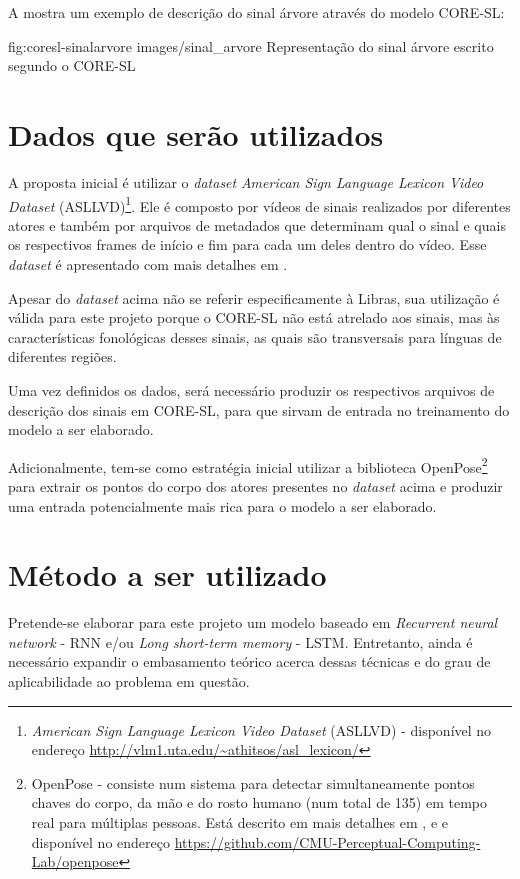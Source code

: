 A  mostra um exemplo de descrição do sinal árvore através do modelo CORE-SL:

\image
    {fig:coresl-sinalarvore}
    {images/sinal_arvore}
    {Representação do sinal árvore escrito segundo o CORE-SL}
    

\section{Dados que serão utilizados}
A proposta inicial é utilizar o \textit{dataset} \textit{American Sign Language Lexicon Video Dataset} (ASLLVD)\footnote{\textit{American Sign Language Lexicon Video Dataset} (ASLLVD) - disponível no endereço \url{http://vlm1.uta.edu/~athitsos/asl_lexicon/}}. Ele é composto por vídeos de sinais realizados por diferentes atores e também por arquivos de metadados que determinam qual o sinal e quais os respectivos frames de início e fim para cada um deles dentro do vídeo. Esse \textit{dataset} é apresentado com mais detalhes em \cite{athitsos-asldataset-2008}.

Apesar do \textit{dataset} acima não se referir especificamente à Libras, sua utilização é válida para este projeto porque o CORE-SL não está atrelado aos sinais, mas às características fonológicas desses sinais, as quais são transversais para línguas de diferentes regiões. 

Uma vez definidos os dados, será necessário produzir os respectivos arquivos de descrição dos sinais em CORE-SL, para que sirvam de entrada no treinamento do modelo a ser elaborado.

Adicionalmente, tem-se como estratégia inicial utilizar a biblioteca OpenPose\footnote{OpenPose - consiste num sistema para detectar simultaneamente pontos chaves do corpo, da mão e do rosto humano (num total de 135) em tempo real para múltiplas pessoas. Está descrito em mais detalhes em \textcite{cao-realtime-2017}, \textcite{simon-hand-2017} e \textcite{wei-cpm-2016} e disponível no endereço \url{https://github.com/CMU-Perceptual-Computing-Lab/openpose}} para extrair os pontos do corpo dos atores presentes no \textit{dataset} acima e produzir uma entrada potencialmente mais rica para o modelo a ser elaborado.

\section{Método a ser utilizado}
Pretende-se elaborar para este projeto um modelo baseado em \textit{Recurrent neural network} - RNN e/ou \textit{Long short-term memory} - LSTM. Entretanto, ainda é necessário expandir o embasamento teórico acerca dessas técnicas e do grau de aplicabilidade ao problema em questão.

